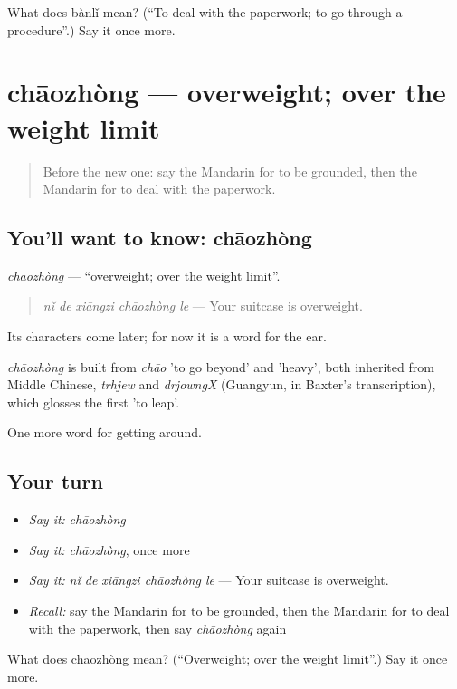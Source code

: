 \begin{tcolorbox}[breakable,colback=teal!4,colframe=teal!35!black,title={Before you move on}]
What does bànlǐ mean? (\textquotedblleft{}To deal with the paperwork; to go through a procedure\textquotedblright{}.) Say it once more.
\end{tcolorbox}
\section[chāozhòng]{chāozhòng — overweight; over the weight limit}

\label{lesson:ZH-C418-chaozhong}



\begin{quote}
Before the new one: say the Mandarin for to be grounded, then the Mandarin for to deal with the paperwork.
\end{quote}

\subsection*{You'll want to know: chāozhòng}
\emph{chāozhòng} — \textquotedblleft{}overweight; over the weight limit\textquotedblright{}.

\begin{quote}
\emph{nǐ de xiāngzi chāozhòng le} — Your suitcase is overweight.
\end{quote}

Its characters come later; for now it is a word for the ear.

\begin{cousinweb}
\emph{chāozhòng} is built from \emph{chāo} 'to go beyond' and  'heavy', both inherited from Middle Chinese, \emph{trhjew} and \emph{drjowngX} (Guangyun, in Baxter's transcription), which glosses the first 'to leap'.
\end{cousinweb}

\begin{grammarlens}[title={What you've built}]
One more word for getting around.
\end{grammarlens}

\subsection*{Your turn}
\begin{itemize}
\raggedright
  \item \emph{Say it:} \emph{chāozhòng}
  \item \emph{Say it:} \emph{chāozhòng}, once more
  \item \emph{Say it:} \emph{nǐ de xiāngzi chāozhòng le} — Your suitcase is overweight.
  \item \emph{Recall:} say the Mandarin for to be grounded, then the Mandarin for to deal with the paperwork, then say \emph{chāozhòng} again
\end{itemize}

\begin{tcolorbox}[breakable,colback=teal!4,colframe=teal!35!black,title={Before you move on}]
What does chāozhòng mean? (\textquotedblleft{}Overweight; over the weight limit\textquotedblright{}.) Say it once more.
\end{tcolorbox}
